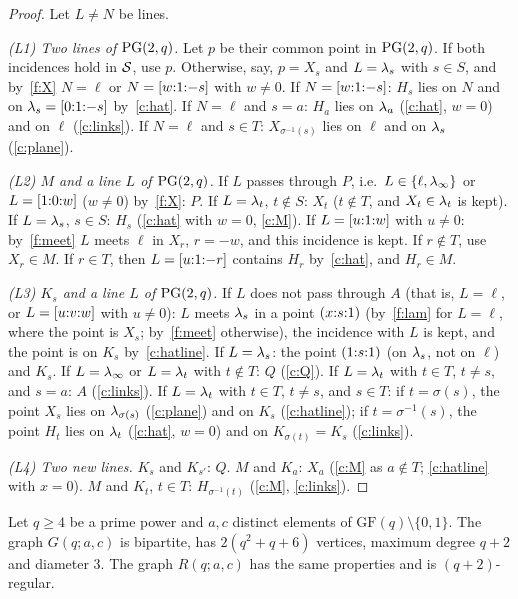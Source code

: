 \begin{proof}
Let $L \ne N$ be lines.

\emph{(L1) Two lines of $\mathrm{PG}(2,q)$.} Let $p$ be their common point in $\mathrm{PG}(2,q)$. If both incidences hold in $\mathcal{S}$, use $p$. Otherwise, say, $p = X_s$ and $L = \lambda_s$ with $s \in S$, and by~\ref{f:X} $N = \ell$ or $N = [{w}{:}{1}{:}{-s}]$ with $w \ne 0$.
If $N = [{w}{:}{1}{:}{-s}]$: $H_s$ lies on $N$ and on $\lambda_s = [{0}{:}{1}{:}{-s}]$ by~\ref{c:hat}.
If $N = \ell$ and $s = a$: $H_a$ lies on $\lambda_a$ (\ref{c:hat}, $w = 0$) and on $\ell$ (\ref{c:links}).
If $N = \ell$ and $s \in T$: $X_{\sigma^{-1}(s)}$ lies on $\ell$ and on $\lambda_s$ (\ref{c:plane}).

\emph{(L2) $M$ and a line $L$ of $\mathrm{PG}(2,q)$.}
If $L$ passes through $P$, i.e.\ $L \in \{\ell, \lambda_\infty\}$ or $L = [{1}{:}{0}{:}{w}]$ ($w \ne 0$) by~\ref{f:X}: $P$.
If $L = \lambda_t$, $t \notin S$: $X_t$ ($t \notin T$, and $X_t \in \lambda_t$ is kept).
If $L = \lambda_s$, $s \in S$: $H_s$ (\ref{c:hat} with $w = 0$, \ref{c:M}).
If $L = [{u}{:}{1}{:}{w}]$ with $u \ne 0$: by~\ref{f:meet} $L$ meets $\ell$ in $X_r$, $r = -w$, and this incidence is kept. If $r \notin T$, use $X_r \in M$. If $r \in T$, then $L = [{u}{:}{1}{:}{-r}]$ contains $H_r$ by~\ref{c:hat}, and $H_r \in M$.

\emph{(L3) $K_s$ and a line $L$ of $\mathrm{PG}(2,q)$.}
If $L$ does not pass through $A$ (that is, $L = \ell$, or $L = [{u}{:}{v}{:}{w}]$ with $u \neq 0$): $L$ meets $\lambda_s$ in a point $({x}{:}{s}{:}{1})$ (by~\ref{f:lam} for $L = \ell$, where the point is $X_s$; by~\ref{f:meet} otherwise), the incidence with $L$ is kept, and the point is on $K_s$ by~\ref{c:hatline}.
If $L = \lambda_s$: the point $({1}{:}{s}{:}{1})$ (on $\lambda_s$, not on $\ell$) and $K_s$.
If $L = \lambda_\infty$ or $L = \lambda_t$ with $t \notin T$: $Q$ (\ref{c:Q}).
If $L = \lambda_t$ with $t \in T$, $t \ne s$, and $s = a$: $A$ (\ref{c:links}).
If $L = \lambda_t$ with $t \in T$, $t \ne s$, and $s \in T$: if $t = \sigma(s)$, the point $X_s$ lies on $\lambda_{\sigma(s)}$ (\ref{c:plane}) and on $K_s$ (\ref{c:hatline}); if $t = \sigma^{-1}(s)$, the point $H_t$ lies on $\lambda_t$ (\ref{c:hat}, $w = 0$) and on $K_{\sigma(t)} = K_s$ (\ref{c:links}).

\emph{(L4) Two new lines.} $K_s$ and $K_{s'}$: $Q$. $M$ and $K_a$: $X_a$ (\ref{c:M} as $a \notin T$; \ref{c:hatline} with $x = 0$). $M$ and $K_t$, $t \in T$: $H_{\sigma^{-1}(t)}$ (\ref{c:M}, \ref{c:links}).
\end{proof}

\begin{theorem}\label{thm:coords}
Let $q \ge 4$ be a prime power and $a, c$ distinct elements of $\mathrm{GF}(q) \setminus \{0,1\}$. The graph $G(q;a,c)$ is bipartite, has $2(q^2+q+6)$ vertices, maximum degree $q+2$ and diameter $3$. The graph $R(q;a,c)$ has the same properties and is $(q+2)$-regular.
\end{theorem}

